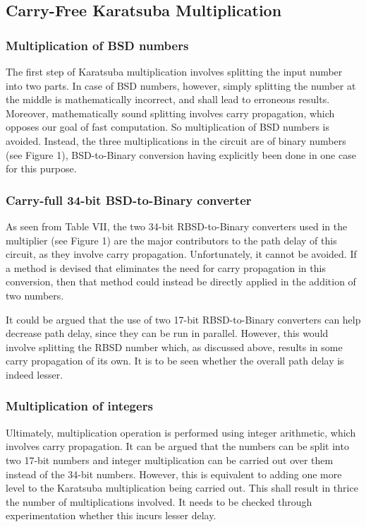 \documentclass[conference]{IEEEtran}
\begin{document}
\subsection{Carry-Free Karatsuba Multiplication}

\subsubsection{Multiplication of BSD numbers}

The first step of Karatsuba multiplication involves splitting the input number into two parts. In case of BSD numbers, however, simply splitting the number at the middle is mathematically incorrect, and shall lead to erroneous results. Moreover, mathematically sound splitting involves carry propagation, which opposes our goal of fast computation. So multiplication of BSD numbers is avoided. Instead, the three multiplications in the circuit are of binary numbers (see Figure 1), BSD-to-Binary conversion having explicitly been done in one case for this purpose.

\subsubsection{Carry-full 34-bit BSD-to-Binary converter}

As seen from Table VII, the two 34-bit RBSD-to-Binary converters used in the multiplier (see Figure 1) are the major contributors to the path delay of this circuit, as they involve carry propagation. Unfortunately, it cannot be avoided. If a method is devised that eliminates the need for carry propagation in this conversion, then that method could instead be directly applied in the addition of two numbers.

It could be argued that the use of two 17-bit RBSD-to-Binary converters can help decrease path delay, since they can be run in parallel. However, this would involve splitting the RBSD number which, as discussed above, results in some carry propagation of its own. It is to be seen whether the overall path delay is indeed lesser.

\subsubsection{Multiplication of integers}

Ultimately, multiplication operation is performed using integer arithmetic, which involves carry propagation. It can be argued that the numbers can be split into two 17-bit numbers and integer multiplication can be carried out over them instead of the 34-bit numbers. However, this is equivalent to adding one more level to the Karatsuba multiplication being carried out. This shall result in thrice the number of multiplications involved. It needs to be checked through experimentation whether this incurs lesser delay.
\end{document}
